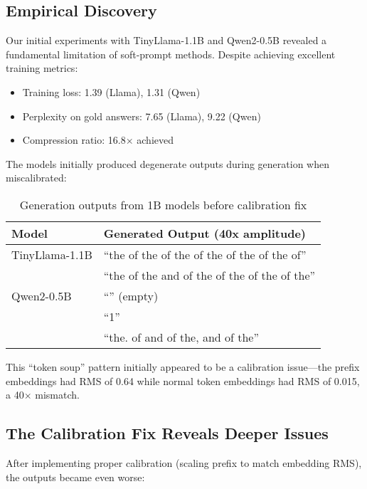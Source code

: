 \documentclass{article}
\begin{document}
\subsection{Empirical Discovery}

Our initial experiments with TinyLlama-1.1B and Qwen2-0.5B revealed a fundamental limitation of soft-prompt methods. Despite achieving excellent training metrics:
\begin{itemize}
\item Training loss: 1.39 (Llama), 1.31 (Qwen)
\item Perplexity on gold answers: 7.65 (Llama), 9.22 (Qwen)
\item Compression ratio: 16.8$\times$ achieved
\end{itemize}

The models initially produced degenerate outputs during generation when miscalibrated:

\begin{table}[h]
\caption{Generation outputs from 1B models before calibration fix}
\label{tab:degenerate_before}
\vskip 0.15in
\begin{center}
\begin{small}
\begin{tabular}{ll}
\toprule
Model & Generated Output (40x amplitude) \\
\midrule
TinyLlama-1.1B & ``the of the of the of the of the of the of'' \\
 & ``the of the and of the of the of the of the'' \\
Qwen2-0.5B & ``'' (empty) \\
 & ``1'' \\
 & ``the. of and of the, and of the'' \\
\bottomrule
\end{tabular}
\end{small}
\end{center}
\vskip -0.1in
\end{table}

This ``token soup'' pattern initially appeared to be a calibration issue—the prefix embeddings had RMS of 0.64 while normal token embeddings had RMS of 0.015, a 40$\times$ mismatch.

\subsection{The Calibration Fix Reveals Deeper Issues}

After implementing proper calibration (scaling prefix to match embedding RMS), the outputs became even worse:
\end{document}

